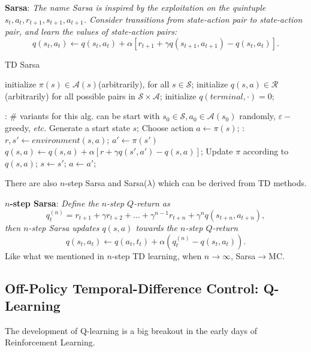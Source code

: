 \documentclass{progartcn}
\begin{document}
			\textbf{Sarsa}: \textit{The name Sarsa is inspired by the exploitation on the quintuple $s_t,a_t,r_{t+1},s_{t+1},a_{t+1}$. Consider transitions from state-action pair to state-action pair, and learn the values of state-action pairs:}
			\[q(s_t,a_t)\gets q(s_t,a_t)+\alpha[r_{t+1}+\gamma q(s_{t+1},a_{t+1})-q(s_t,a_t)].\]

			\begin{algorithm}[h]
			\caption{TD Sarsa}
			\label{alg: TD Sarsa}
			\begin{algorithmic}[1]
			\State initialize $\pi(s)\in \mathcal{A}(s)$(arbitrarily), for all $s\in \mathcal{S}$; initialize $q(s,a)\in\mathcal{R}$(arbitrarily) for all possible pairs in $\mathcal{S}\times\mathcal{A}$; initialize $q(terminal,\cdot)=0$;
	        
            :
            	\Statex \# variants for this alg. can be start with $s_0\in\mathcal{S},a_0\in\mathcal{A}(s_0)$ randomly, $\varepsilon-$greedy, \textit{etc.}
            	\State Generate a start state $s$;
            	\State Choose action $a\gets\pi(s)$;
            	:
            		\State $r,s'\gets environment(s,a)$;
            		\State $a'\gets \pi(s')$
            		\State $q(s,a)\gets q(s,a)+\alpha[r+\gamma q(s',a')-q(s,a)]$;
            		\State Update $\pi$ according to $q(s,a)$;
            		\State $s\gets s'$;
            		\State $a\gets a'$;
            	\EndWhile
            \EndFor
	        \end{algorithmic}
	        \end{algorithm}

			There are also $n$-step Sarsa and Sarsa($\lambda$) which can be derived from TD methods.

            \textbf{$n$-step Sarsa}: \textit{Define the $n$-step $Q$-return as}
            	\[q^{(n)}_t=r_{t+1}+\gamma r_{t+2}+...+\gamma^{n-1}r_{t+n}+\gamma^n q(s_{t+n},a_{t+n}),\]
            \textit{then $n$-step Sarsa updates $q(s,a)$ towards the $n$-step $Q$-return}
            	\[q(s_t,a_t)\gets q(a_t,t_t)+\alpha (q_t^{(n)}-q(s_t,a_t)).\]
            Like what we mentioned in $n$-step TD learning, when $n\to\infty$, Sarsa$\to$MC.\\

		\subsection{Off-Policy Temporal-Difference Control: Q-Learning}

			The development of Q-learning is a big breakout in the early days of Reinforcement Learning.
\end{document}
